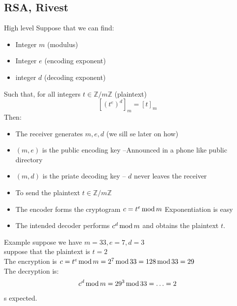 \subsection{RSA, Rivest}
\begin{parag}{High level}
    Suppose that we can find:
    \begin{itemize}
      \item  Integer $m$ (modulus)
      \item Integer $e$ (encoding exponent)
      \item integer $d$ (decoding exponent) 
    \end{itemize}
    Such that, for all integers $t \in \mathbb{Z} / m \mathbb{Z}$ (plaintext)
    \begin{equation*} \left[\left(t^e\right)^d\right]_m = \left[t\right]_m \end{equation*}
    Then:
    \begin{itemize}
        \item The receiver generates $m, e, d$ (we sill se later on how)
        \item $\left(m, e\right)$ is the public encoding key --Announced in a phone like public directory
        \item $\left(m, d\right)$ is the priate decoding key -- $d$ never leaves the receiver
        \item To send the plaintext $t \in \mathbb{Z} / m \mathbb{Z}$
        \item The encoder forms the cryptogram $c = t^e \operatorname{mod} m$ Exponentiation is easy
        \item The intended decoder performs $c^d \operatorname{mod} m$ and obtains the plaintext $t$.
        
    \end{itemize}
    
    
    
\end{parag}

\begin{parag}{Example}
    suppose we have $m = 33, e = 7, d = 3$\\
    suppose that the plaintext is $t = 2$\\
    The encryption is $c = t^e \operatorname{mod} m = 2^7 \operatorname{mod} 33 = 128 \operatorname{mod} 33 = 29$\\
    The decryption is: 
    \begin{equation*} c^d \operatorname{mod} m = 29^3 \operatorname{mod} 33 = \ldots = 2 \end{equation*}
    s expected.
    
\end{parag}

